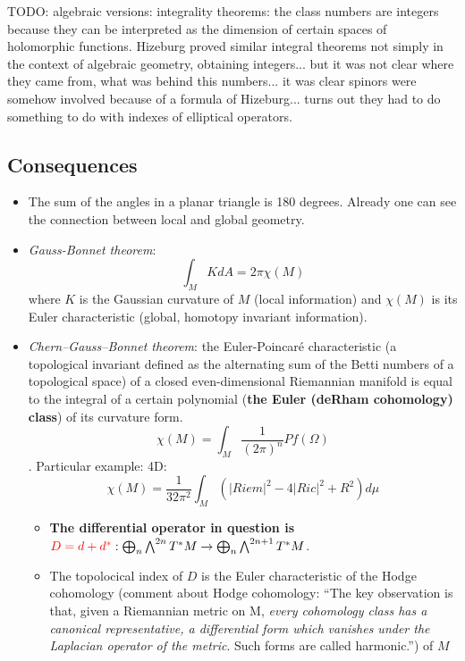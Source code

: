 \documentclass{article}
\begin{document}
TODO: algebraic versions: integrality theorems: the class numbers are integers because they can be interpreted as the dimension of certain spaces of holomorphic functions. Hizeburg proved similar integral theorems not simply in the context of algebraic geometry, obtaining integers... but it was not clear where they came from, what was behind this numbers... it was clear spinors were somehow involved because of a formula of Hizeburg... turns out they had to do something to do with indexes of elliptical operators.

\subsection{Consequences}

\begin{itemize}
    \item The sum of the angles in a planar triangle is 180 degrees. Already one can see the connection between local and global geometry.
    
    \item \emph{Gauss-Bonnet theorem}: \[\int_M K dA = 2\pi \chi(M)\] where $K$ is the Gaussian curvature of $M$ (local information) and $\chi(M)$ is its Euler characteristic (global, homotopy invariant information).

    \item \emph{Chern–Gauss–Bonnet theorem}: the Euler-Poincaré characteristic (a topological invariant defined as the alternating sum of the Betti numbers of a topological space) of a closed even-dimensional Riemannian manifold is equal to the integral of a certain polynomial (\textbf{the Euler (deRham cohomology) class}) of its curvature form. \[\chi(M) = \int_M \frac{1}{(2\pi)^n} Pf(\Omega)\]. Particular example: 4D: \[ \chi(M) = \frac{1}{32 \pi^2} \int_M (|Riem|^2 - 4|Ric|^2 + R^2) d\mu \]
    
        \begin{itemize}
        \item \textbf{The differential operator in question is }$\textcolor{red}{D = d + d^*} : \bigoplus_n \bigwedge^{2n}T^*M \to \bigoplus_n \bigwedge^{2n+1}T^*M$.
        
        \item The topolocical index of $D$ is the Euler characteristic of the Hodge cohomology (comment about Hodge cohomology: ``The key observation is that, given a Riemannian metric on M, \emph{every cohomology class has a canonical representative, a differential form which vanishes under the Laplacian operator of the metric}. Such forms are called harmonic.'') of $M$
        

\end{itemize}
\end{itemize}
\end{document}
